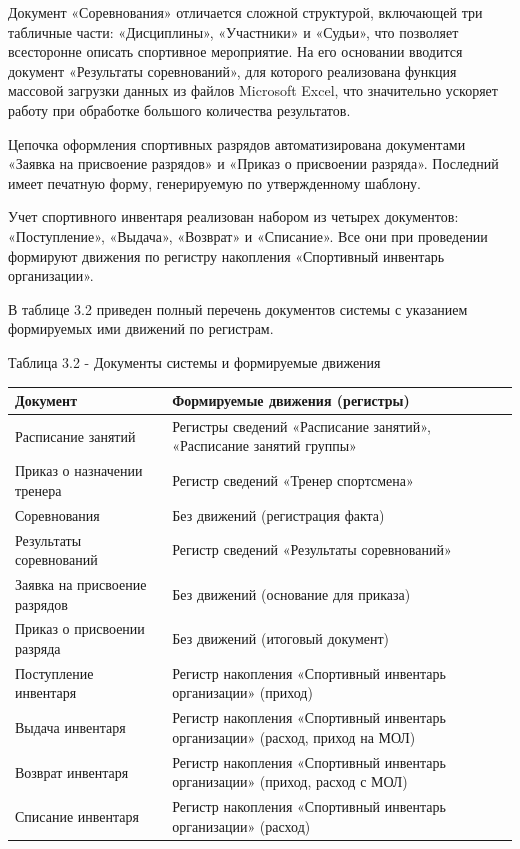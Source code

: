 Документ «Соревнования» отличается сложной структурой, включающей три табличные части: «Дисциплины», «Участники» и «Судьи», что позволяет всесторонне описать спортивное мероприятие. На его основании вводится документ «Результаты соревнований», для которого реализована функция массовой загрузки данных из файлов Microsoft Excel, что значительно ускоряет работу при обработке большого количества результатов.

Цепочка оформления спортивных разрядов автоматизирована документами «Заявка на присвоение разрядов» и «Приказ о присвоении разряда». Последний имеет печатную форму, генерируемую по утвержденному шаблону.

Учет спортивного инвентаря реализован набором из четырех документов: «Поступление», «Выдача», «Возврат» и «Списание». Все они при проведении формируют движения по регистру накопления «Спортивный инвентарь организации».

В таблице 3.2 приведен полный перечень документов системы с указанием формируемых ими движений по регистрам.

\newpage

\noindent
{Таблица 3.2 - Документы системы и формируемые движения}
\par\vspace{0.2cm}
\noindent
\begin{tabular}{|p{6cm}|p{9.5cm}|}
		\hline
		{Документ} & {Формируемые движения (регистры)} \\
		\hline
		Расписание занятий & Регистры сведений «Расписание занятий», «Расписание занятий группы» \\
		\hline
		Приказ о назначении тренера & Регистр сведений «Тренер спортсмена» \\
		\hline
		Соревнования & Без движений (регистрация факта) \\
		\hline
		Результаты соревнований & Регистр сведений «Результаты соревнований» \\
		\hline
		Заявка на присвоение разрядов & Без движений (основание для приказа) \\
		\hline
		Приказ о присвоении разряда & Без движений (итоговый документ) \\
		\hline
		Поступление инвентаря & Регистр накопления «Спортивный инвентарь организации» (приход) \\
		\hline
		Выдача инвентаря & Регистр накопления «Спортивный инвентарь организации» (расход, приход на МОЛ) \\
		\hline
		Возврат инвентаря & Регистр накопления «Спортивный инвентарь организации» (приход, расход с МОЛ) \\
		\hline
		Списание инвентаря & Регистр накопления «Спортивный инвентарь организации» (расход) \\
		\hline
\end{tabular}
\vspace{0.4cm}

